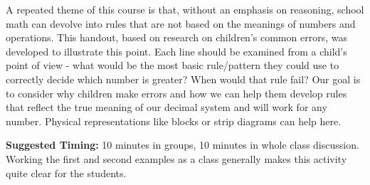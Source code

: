 \documentclass{ximera}
\begin{document}
\newpage
\begin{instructorNotes}
A repeated theme of this course is that, without an emphasis on reasoning, school math can devolve into rules that are not based on the meanings of numbers and operations.  This handout, based on research on children's common errors, was developed to illustrate this point.  Each line should be examined from a child's point of view - what would be the most basic rule/pattern they could use to correctly decide which number is greater? When would that rule fail? Our goal is to consider why children make errors and how we can help them develop rules that reflect the true meaning of our decimal system and will work for any number.  Physical representations like blocks or strip diagrams can help here.


{\bf Suggested Timing:} 10 minutes in groups, 10 minutes in whole class discussion.  Working the first and second examples as a class generally makes this activity quite clear for the students.
\end{instructorNotes}
\end{document}

